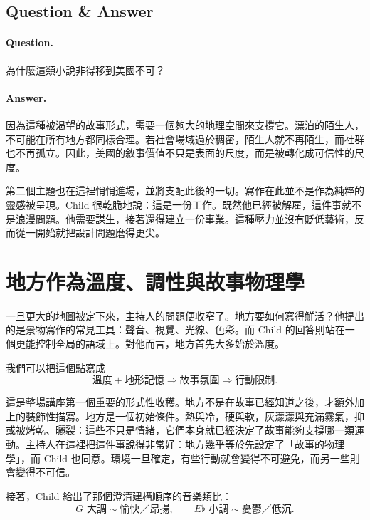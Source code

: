 \subsection{Question \& Answer}

\paragraph{Question.} 為什麼這類小說非得移到美國不可？

\paragraph{Answer.} 因為這種被渴望的故事形式，需要一個夠大的地理空間來支撐它。漂泊的陌生人，不可能在所有地方都同樣合理。若社會場域過於稠密，陌生人就不再陌生，而社群也不再孤立。因此，美國的敘事價值不只是表面的尺度，而是被轉化成可信性的尺度。

第二個主題也在這裡悄悄進場，並將支配此後的一切。寫作在此並不是作為純粹的靈感被呈現。Child 很乾脆地說：這是一份工作。既然他已經被解雇，這件事就不是浪漫問題。他需要謀生，接著還得建立一份事業。這種壓力並沒有貶低藝術，反而從一開始就把設計問題磨得更尖。

\section{地方作為溫度、調性與故事物理學}

一旦更大的地圖被定下來，主持人的問題便收窄了。地方要如何寫得鮮活？他提出的是景物寫作的常見工具：聲音、視覺、光線、色彩。而 Child 的回答則站在一個更能控制全局的語域上。對他而言，地方首先大多始於溫度。

我們可以把這個點寫成
\begin{equation}
\text{溫度} + \text{地形記憶} \Longrightarrow \text{故事氛圍} \Longrightarrow \text{行動限制}.
\end{equation}

這是整場講座第一個重要的形式性收穫。地方不是在故事已經知道之後，才額外加上的裝飾性描寫。地方是一個初始條件。熱與冷，硬與軟，灰濛濛與充滿霧氣，抑或被烤乾、曬裂：這些不只是情緒，它們本身就已經決定了故事能夠支撐哪一類運動。主持人在這裡把這件事說得非常好：地方幾乎等於先設定了「故事的物理學」，而 Child 也同意。環境一旦確定，有些行動就會變得不可避免，而另一些則會變得不可信。

接著，Child 給出了那個澄清建構順序的音樂類比：
\begin{equation}
G\text{ 大調} \sim \text{愉快／昂揚}, \qquad
E\flat \text{ 小調} \sim \text{憂鬱／低沉}.
\end{equation}

